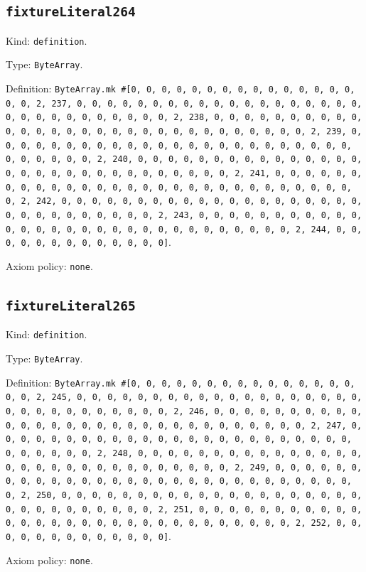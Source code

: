 \documentclass[11pt]{article}
\begin{document}
\subsection*{\texttt{fixtureLiteral264}}
\noindent Kind: \texttt{definition}.\par
\noindent Type: \texttt{ByteArray}.\par
\noindent Definition: \texttt{ByteArray.mk \#[0, 0, 0, 0, 0, 0, 0, 0, 0, 0, 0, 0, 0, 0, 0, 0, 0, 2, 237, 0, 0, 0, 0, 0, 0, 0, 0, 0, 0, 0, 0, 0, 0, 0, 0, 0, 0, 0, 0, 0, 0, 0, 0, 0, 0, 0, 0, 0, 0, 2, 238, 0, 0, 0, 0, 0, 0, 0, 0, 0, 0, 0, 0, 0, 0, 0, 0, 0, 0, 0, 0, 0, 0, 0, 0, 0, 0, 0, 0, 0, 0, 2, 239, 0, 0, 0, 0, 0, 0, 0, 0, 0, 0, 0, 0, 0, 0, 0, 0, 0, 0, 0, 0, 0, 0, 0, 0, 0, 0, 0, 0, 0, 0, 2, 240, 0, 0, 0, 0, 0, 0, 0, 0, 0, 0, 0, 0, 0, 0, 0, 0, 0, 0, 0, 0, 0, 0, 0, 0, 0, 0, 0, 0, 0, 0, 2, 241, 0, 0, 0, 0, 0, 0, 0, 0, 0, 0, 0, 0, 0, 0, 0, 0, 0, 0, 0, 0, 0, 0, 0, 0, 0, 0, 0, 0, 0, 0, 2, 242, 0, 0, 0, 0, 0, 0, 0, 0, 0, 0, 0, 0, 0, 0, 0, 0, 0, 0, 0, 0, 0, 0, 0, 0, 0, 0, 0, 0, 0, 0, 2, 243, 0, 0, 0, 0, 0, 0, 0, 0, 0, 0, 0, 0, 0, 0, 0, 0, 0, 0, 0, 0, 0, 0, 0, 0, 0, 0, 0, 0, 0, 0, 2, 244, 0, 0, 0, 0, 0, 0, 0, 0, 0, 0, 0, 0, 0]}.\par
\noindent Axiom policy: \texttt{none}.\par
\subsection*{\texttt{fixtureLiteral265}}
\noindent Kind: \texttt{definition}.\par
\noindent Type: \texttt{ByteArray}.\par
\noindent Definition: \texttt{ByteArray.mk \#[0, 0, 0, 0, 0, 0, 0, 0, 0, 0, 0, 0, 0, 0, 0, 0, 0, 2, 245, 0, 0, 0, 0, 0, 0, 0, 0, 0, 0, 0, 0, 0, 0, 0, 0, 0, 0, 0, 0, 0, 0, 0, 0, 0, 0, 0, 0, 0, 0, 2, 246, 0, 0, 0, 0, 0, 0, 0, 0, 0, 0, 0, 0, 0, 0, 0, 0, 0, 0, 0, 0, 0, 0, 0, 0, 0, 0, 0, 0, 0, 0, 2, 247, 0, 0, 0, 0, 0, 0, 0, 0, 0, 0, 0, 0, 0, 0, 0, 0, 0, 0, 0, 0, 0, 0, 0, 0, 0, 0, 0, 0, 0, 0, 2, 248, 0, 0, 0, 0, 0, 0, 0, 0, 0, 0, 0, 0, 0, 0, 0, 0, 0, 0, 0, 0, 0, 0, 0, 0, 0, 0, 0, 0, 0, 0, 2, 249, 0, 0, 0, 0, 0, 0, 0, 0, 0, 0, 0, 0, 0, 0, 0, 0, 0, 0, 0, 0, 0, 0, 0, 0, 0, 0, 0, 0, 0, 0, 2, 250, 0, 0, 0, 0, 0, 0, 0, 0, 0, 0, 0, 0, 0, 0, 0, 0, 0, 0, 0, 0, 0, 0, 0, 0, 0, 0, 0, 0, 0, 0, 2, 251, 0, 0, 0, 0, 0, 0, 0, 0, 0, 0, 0, 0, 0, 0, 0, 0, 0, 0, 0, 0, 0, 0, 0, 0, 0, 0, 0, 0, 0, 0, 2, 252, 0, 0, 0, 0, 0, 0, 0, 0, 0, 0, 0, 0, 0]}.\par
\noindent Axiom policy: \texttt{none}.\par
\end{document}

